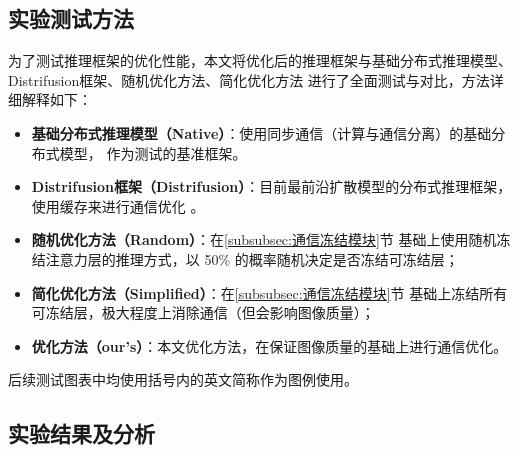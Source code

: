 \subsection{实验测试方法}
\label{sec:experiment-method}
为了测试推理框架的优化性能，本文将优化后的推理框架与基础分布式推理模型、Distrifusion框架、随机优化方法、简化优化方法
进行了全面测试与对比，方法详细解释如下：
\begin{itemize}
    \item \textbf{基础分布式推理模型（Native）}：使用同步通信（计算与通信分离）的基础分布式模型，
    作为测试的基准框架。
    \item \textbf{Distrifusion框架（Distrifusion）}：目前最前沿扩散模型的分布式推理框架，使用缓存来进行通信优化
    \cite{li2024distrifusion}。
    \item \textbf{随机优化方法（Random）}：在\ref{subsubsec:通信冻结模块}节
    基础上使用随机冻结注意力层的推理方式，以 50\% 的概率随机决定是否冻结可冻结层；
    \item \textbf{简化优化方法（Simplified）}：在\ref{subsubsec:通信冻结模块}节
    基础上冻结所有可冻结层，极大程度上消除通信（但会影响图像质量）；
    \item \textbf{优化方法（our's）}：本文优化方法，在保证图像质量的基础上进行通信优化。
\end{itemize}
\par
后续测试图表中均使用括号内的英文简称作为图例使用。
\subsection{实验结果及分析}
